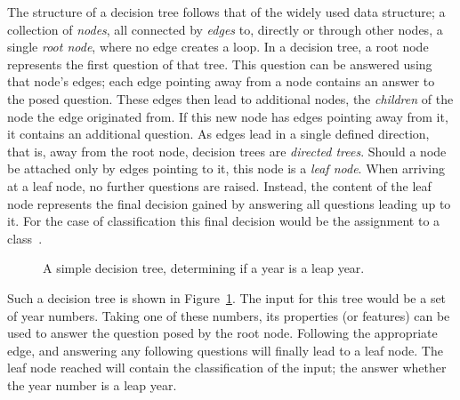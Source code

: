 The structure of a decision tree follows that of the widely used data structure;
a collection of \textit{nodes}, all connected by \textit{edges} to, directly or 
through other nodes, a single \textit{root node}, where no edge creates a 
loop. In a decision tree, a root node represents the first question of that 
tree. This question can be answered using that node's edges; each edge pointing
away from a node contains an answer to the posed question. These edges then lead
to additional nodes, the \textit{children} of the node the edge originated from.
If this new node has edges pointing away from it, it contains an additional 
question. As edges lead in a single defined direction, that is, away from the 
root node, decision trees are \textit{directed trees}. Should a node be attached
only by edges pointing to it, this node is 
a \textit{leaf node}. When arriving at a leaf node, no further questions are 
raised. Instead, the content of the leaf node represents the final decision
gained by answering all questions leading up to it. For the case of 
classification this final decision would be the assignment to a class~\cite{tree_data_structure}.

\begin{figure}[H]
    \centering

    \caption{A simple decision tree, determining if a year is a leap year.}\label{fig:decision_tree}
\end{figure}

Such a decision tree is shown in Figure~\ref{fig:decision_tree}. The input for 
this tree would be a set of year numbers. Taking one of these numbers, its 
properties (or features) can be used to answer the question posed by the root 
node. Following the appropriate edge, and answering any following questions will
finally lead to a leaf node. The leaf node reached will contain the 
classification of the input; the answer whether the year number is a leap year.

